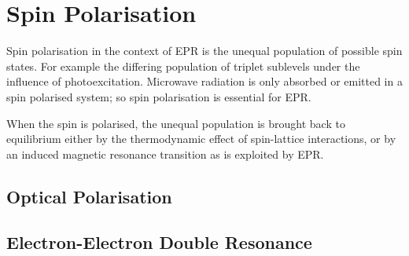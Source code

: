 \section{Spin Polarisation}\label{spin_polarisation}
\cite{2008}\cite{Weil2006}\cite{Goldfarb2018-he}\cite{Richert2017}
Spin polarisation in the context of EPR is the unequal population of possible spin states. 
For example the differing population of triplet sublevels under the influence of photoexcitation. 
Microwave radiation is only absorbed or emitted in a spin polarised system; so spin polarisation is essential for EPR. 

When the spin is polarised, the unequal population is brought back to equilibrium either by the thermodynamic effect of spin-lattice interactions, or by an induced magnetic resonance transition as is exploited by EPR.


\subsection{Optical Polarisation}
\subsection{Electron-Electron Double Resonance}
